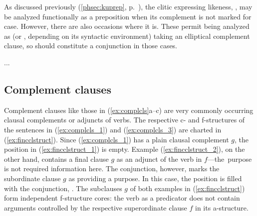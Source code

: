 \label{phsec:kuconj}
As discussed previously (\autoref{phsec:kuprep}, p.~\pageref{phsec:kuprep}),
the clitic expressing likeness, , may be analyzed functionally
as a preposition when its complement is not marked for case. However, there are
also occasions where it is. These permit being analyzed as  (or 
, depending on its syntactic environment) taking an elliptical
complement clause, so  should constitute a conjunction in those
cases.

...

\subsection{Complement clauses}
\label{subsec:complcs}

Complement clauses like those in (\ref{ex:complcls}a–c) are very commonly
occurring clausal complements or adjuncts of verbs. The respective c- and
f-structures of the sentences in (\ref{ex:complcls_1}) and
(\ref{ex:complcls_3}) are charted in (\ref{ex:fincclstruct}). Since
(\ref{ex:complcls_1}) has a plain clausal complement $g$, the 
position in (\ref{ex:fincclstruct_1}) is empty. Example
(\ref{ex:fincclstruct_2}), on the other hand, contains a final clause $g$ as an
adjunct of the verb in $f$---the purpose is not required information here. The
conjunction, however, marks the subordinate clause $g$ as providing a purpose.
In this case, the  position is filled with the conjunction, 
. The subclauses $g$ of both examples in
(\ref{ex:fincclstruct}) form independent f-structure cores: the verb as a
predicator does not contain arguments controlled by the respective
superordinate clause $f$ in its a-structure.

